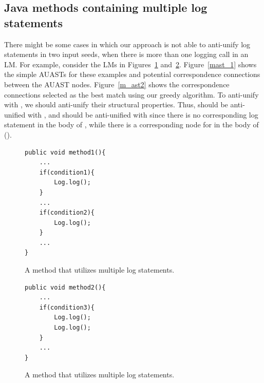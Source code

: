 

\subsection{Java methods containing multiple log statements} \label{meth-multipleLogs}
There might be some cases in which our approach is not able to anti-unify log statements in two input seeds, when there is more than one logging call in an LM. For example, consider the LMs in Figures~\ref{multiple1} and~\ref{multiple2}. Figure~\ref{mast_1} shows the simple AUASTs for these examples and potential correspondence connections between the AUAST nodes. Figure~\ref{m_ast2} shows the correspondence connections selected as the best match using our greedy algorithm. To anti-unify  with , we should anti-unify their structural properties. Thus,  should be anti-unified with , and  should be anti-unified with \NIL{} since there is no corresponding log statement in the body of , while there is a corresponding node for  in the body of  ().


\begin{figure}[t]
\def\baselinestretch{1}
\begin{lstlisting}
public void method1(){
	...
	if(condition1){
		Log.log();
	}
	...
	if(condition2){
		Log.log();
	}
	...
}
\end{lstlisting}
\caption{A  method that utilizes multiple log statements.\label{multiple1}}
\end{figure}



\begin{figure}[H]
\def\baselinestretch{1}
\begin{lstlisting}
public void method2(){
	...
	if(condition3){
		Log.log();
		Log.log();
	}
	...
}
\end{lstlisting}
\caption{A  method that utilizes multiple log statements.\label{multiple2}}
\end{figure}

